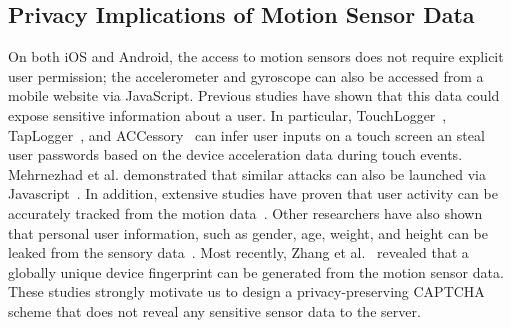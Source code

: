 \subsection{Privacy Implications of Motion Sensor Data}

On both iOS and Android, the access to motion sensors does not require explicit user permission; the accelerometer and gyroscope can also be accessed from a mobile website via JavaScript. Previous studies have shown that this data could expose sensitive information about a user. In particular, TouchLogger~\cite{Cai:2011:TIK:2028040.2028049}, TapLogger~\cite{xu2012taplogger}, and ACCessory~\cite{owusu2012accessory} can infer user inputs on a touch screen an steal user passwords based on the device acceleration data during touch events. Mehrnezhad et al. demonstrated that similar attacks can also be launched via Javascript~\cite{mehrnezhad2016touchsignatures}. In addition, extensive studies have proven that user activity can be accurately tracked from the motion data~\cite{REYESORTIZ2016754,SANSEGUNDO2018190}. Other researchers have also shown that personal user information, such as gender, age, weight, and height can be leaked from the sensory data~\cite{Malekzadeh:2018:PSD:3195258.3195260,davarci2017age}. Most recently, Zhang et al.~\cite{zhang2019sensorid} revealed that a globally unique device fingerprint can be generated from the motion sensor data. These studies strongly motivate us to design a privacy-preserving CAPTCHA scheme that does not reveal any sensitive sensor data to the server.